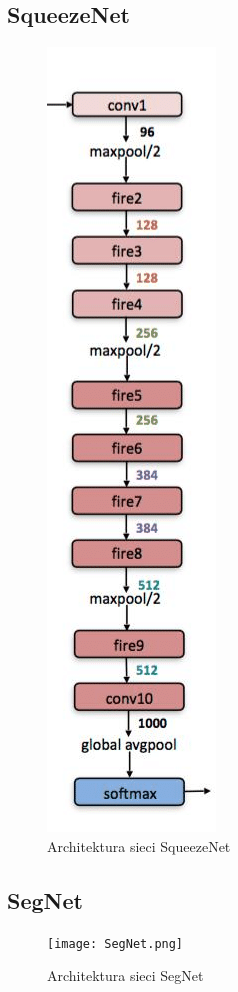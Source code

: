 \documentclass[a4paper,twoside,titlepage,openright]{book}
\begin{document}
\subsection{SqueezeNet}

\begin{figure}[h]
	\centering
			\includegraphics[resolution=120]{SqueezeNet.png}
		\caption{Architektura sieci SqueezeNet}
\end{figure}

\subsection{SegNet}
\begin{figure}[h]
	\centering
			\texttt{[image: SegNet.png]}
		\caption{Architektura sieci SegNet}
\end{figure}
\end{document}
